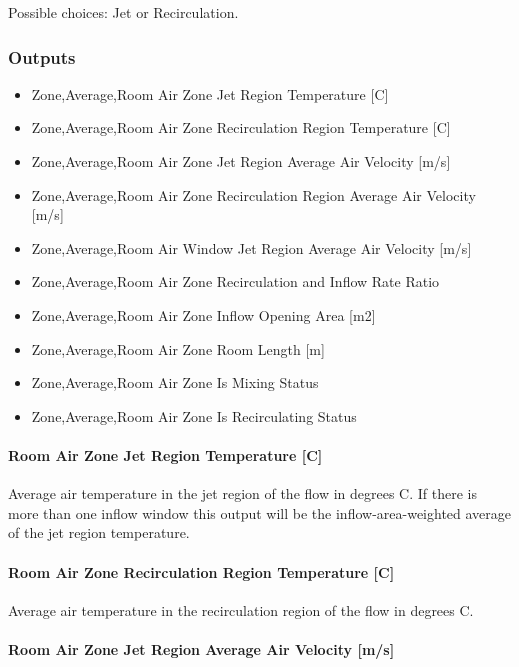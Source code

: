 Possible choices: Jet or Recirculation.

\subsubsection{Outputs}

\begin{itemize}
\item
  Zone,Average,Room Air Zone Jet Region Temperature {[}C{]}
\item
  Zone,Average,Room Air Zone Recirculation Region Temperature {[}C{]}
\item
  Zone,Average,Room Air Zone Jet Region Average Air Velocity {[}m/s{]}
\item
  Zone,Average,Room Air Zone Recirculation Region Average Air Velocity {[}m/s{]}
\item
  Zone,Average,Room Air Window Jet Region Average Air Velocity {[}m/s{]}
\item
  Zone,Average,Room Air Zone Recirculation and Inflow Rate Ratio
\item
  Zone,Average,Room Air Zone Inflow Opening Area {[}m2{]}
\item
  Zone,Average,Room Air Zone Room Length {[}m{]}
\item
  Zone,Average,Room Air Zone Is Mixing Status
\item
  Zone,Average,Room Air Zone Is Recirculating Status
\end{itemize}

\paragraph{Room Air Zone Jet Region Temperature {[}C{]}}\label{room-air-zone-jet-region-temperature-c}

Average air temperature in the jet region of the flow in degrees C. If there is more than one inflow window this output will be the inflow-area-weighted average of the jet region temperature.

\paragraph{Room Air Zone Recirculation Region Temperature {[}C{]}}\label{room-air-zone-recirculation-region-temperature-c}

Average air temperature in the recirculation region of the flow in degrees C.

\paragraph{Room Air Zone Jet Region Average Air Velocity {[}m/s{]}}\label{room-air-zone-jet-region-average-air-velocity-ms}

